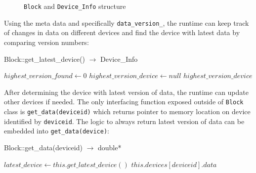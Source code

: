 \begin{figure}[h]
  \caption{\texttt{Block} and \texttt{Device\_Info} structure}\label{fig:Device_Info_Structure}
\end{figure}

Using the meta data and specifically \texttt{data\_version\_}, the runtime can keep
track of changes in data on different devices and find the device with latest
data by comparing version numbers:

\begin{algorithm} {Block::get\_latest\_device() $\rightarrow$ Device\_Info}
  \singlespacing

  \begin{algorithmic}[1]
    \State $highest\_version\_found \gets 0$
    \State $highest\_version\_device \gets null$
    \EndIf
    \EndFor
    \State \Return $highest\_version\_device$
    \EndFunction
  \end{algorithmic}
\end{algorithm}

After determining the device with latest version of data, the runtime can update
other devices if needed. The only interfacing function exposed outside of
\texttt{Block} class is \texttt{get\_data(deviceid)} which returns pointer to memory
location on device identified by \texttt{deviceid}. The logic to always return
latest version of data can be embedded into \texttt{get\_data(device)}:

\begin{algorithm}  {Block::get\_data(deviceid) $\rightarrow$ double*}
  \singlespacing

  \begin{algorithmic}[1]
    \State $latest\_device \gets this.get\_latest\_device()$
    \EndIf
    \State \Return $this.devices[deviceid].data$
    \EndFunction
  \end{algorithmic}
  \label{alg:get_data}
\end{algorithm}

